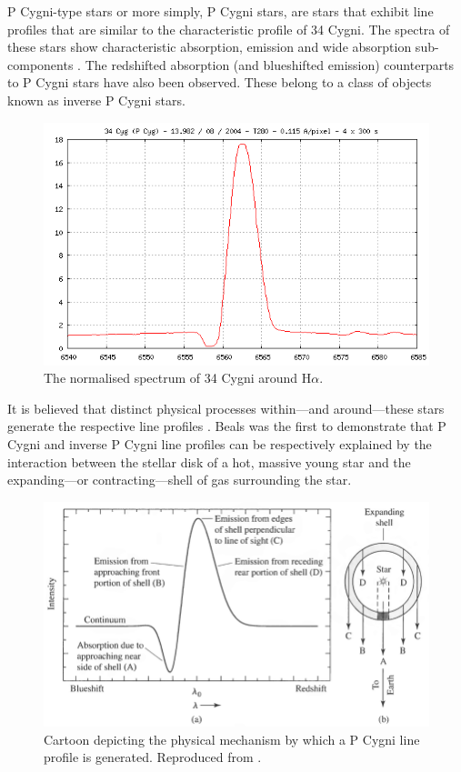 P Cygni-type stars or more simply, P Cygni stars, are stars that exhibit line profiles that are similar to the characteristic profile of 34 Cygni. The spectra of these stars show characteristic absorption, emission and wide absorption sub-components \citep{zhang2021catalog}. The redshifted absorption (and blueshifted emission) counterparts to P Cygni stars have also been observed. These  belong to a class of objects known as inverse P Cygni stars. %

\begin{figure}[!htb]
\centering
\includegraphics[scale=.60]{figures/34cygni.png}
\caption{The normalised spectrum of 34 Cygni around H$\alpha$.}
\end{figure}

It is believed that distinct physical processes within—and around—these stars generate the respective line profiles \citep{hou2016catalog}. Beals \citeyear{1953PDAO....9....1B} was the first to demonstrate that P Cygni and inverse P Cygni line profiles can be respectively explained by the interaction between the stellar disk of a hot, massive young star and the expanding—or contracting—shell of gas surrounding the star. 

\begin{figure}[!htb]
\centering
\includegraphics[scale=.52]{figures/expandingpcygni.png}
\caption{Cartoon depicting the physical mechanism by which a P Cygni line profile is generated. Reproduced from \citet{kasai2013type}.}
\label{fig1.2}
\end{figure}

